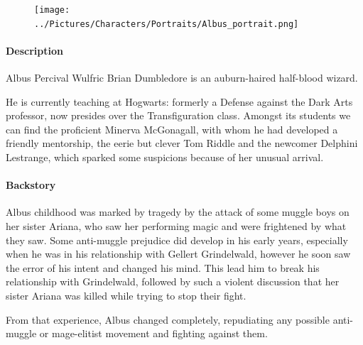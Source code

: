 \begin{figure}
\centering
\texttt{[image: ../Pictures/Characters/Portraits/Albus\_portrait.png]}
\end{figure}

\paragraph{Description}
Albus Percival Wulfric Brian Dumbledore is an auburn-haired half-blood wizard.

He is currently teaching at Hogwarts: formerly a Defense against the Dark Arts professor, now presides over the Transfiguration class. Amongst its students we can find the proficient Minerva McGonagall, with whom he had developed a friendly mentorship, the eerie but clever Tom Riddle and the newcomer Delphini Lestrange, which sparked some suspicions because of her unusual arrival.

\paragraph{Backstory}
Albus childhood was marked by tragedy by the attack of some muggle boys on her sister Ariana, who saw her performing magic and were frightened by what they saw. Some anti-muggle prejudice did develop in his early years, especially when he was in his relationship with Gellert Grindelwald, however he soon saw the error of his intent and changed his mind. This lead him to break his relationship with Grindelwald, followed by such a violent discussion that her sister Ariana was killed while trying to stop their fight. 

From that experience, Albus changed completely, repudiating any possible anti-muggle or mage-elitist movement and fighting against them.

